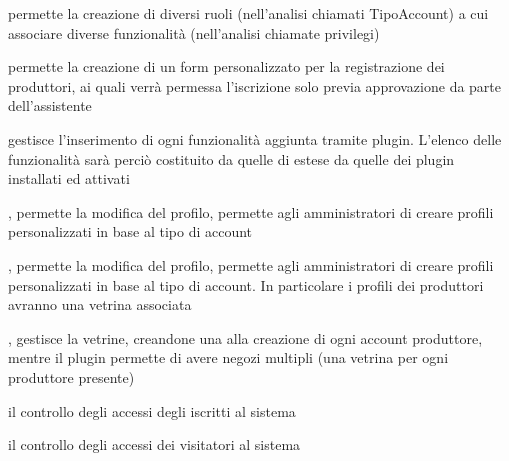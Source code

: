 
{}
{ permette la creazione di diversi ruoli (nell'analisi chiamati TipoAccount) a cui associare diverse funzionalità (nell'analisi chiamate privilegi)}


{}
{ permette la creazione di un form personalizzato per la registrazione dei produttori, ai quali verrà permessa l'iscrizione solo previa approvazione da parte dell'assistente}


{}
{ gestisce l'inserimento di ogni funzionalità aggiunta tramite plugin. L'elenco delle funzionalità sarà perciò costituito da quelle di  estese da quelle dei plugin installati ed attivati}


{, }
{ permette la modifica del profilo,  permette agli amministratori di creare profili personalizzati in base al tipo di account}


{, }
{ permette la modifica del profilo,  permette agli amministratori di creare profili personalizzati in base al tipo di account. In particolare i profili dei produttori avranno una vetrina associata}


{, }
{ gestisce la vetrine, creandone una alla creazione di ogni account produttore, mentre il plugin  permette di avere negozi multipli (una vetrina per ogni produttore presente)}


{}
{ il controllo degli accessi degli iscritti al sistema}


{}
{ il controllo degli accessi dei visitatori al sistema}


